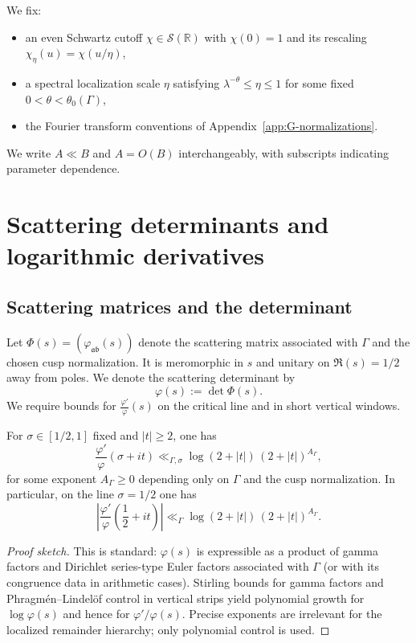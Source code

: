We fix:
\begin{itemize}
\item an even Schwartz cutoff $\chi\in\mathcal{S}(\mathbb{R})$ with $\chi(0)=1$ and its rescaling
$\chi_\eta(u)=\chi(u/\eta)$,
\item a spectral localization scale $\eta$ satisfying $\lambda^{-\theta}\le \eta\le 1$ for some fixed
$0<\theta<\theta_0(\Gamma)$,
\item the Fourier transform conventions of Appendix~\ref{app:G-normalizations}.
\end{itemize}

We write $A\ll B$ and $A=O(B)$ interchangeably, with subscripts indicating parameter dependence.

\section{Scattering determinants and logarithmic derivatives}
\label{sec:B.scattering}

\subsection{Scattering matrices and the determinant}
\label{subsec:B.scattering-matrix}

Let $\Phi(s)=(\varphi_{\mathfrak{a}\mathfrak{b}}(s))$ denote the scattering matrix associated with $\Gamma$ and the
chosen cusp normalization.  It is meromorphic in $s$ and unitary on $\Re(s)=1/2$ away from poles.  We denote the
scattering determinant by
\[
\varphi(s):=\det \Phi(s).
\]
We require bounds for $\frac{\varphi'}{\varphi}(s)$ on the critical line and in short vertical windows.

\begin{proposition}
\label{prop:B.scattering-poly}
For $\sigma\in[1/2,1]$ fixed and $|t|\ge 2$, one has
\begin{equation}
\label{eq:B.scattering-poly}
\frac{\varphi'}{\varphi}(\sigma+it)
\ll_{\Gamma,\sigma}
\log(2+|t|)\,(2+|t|)^{A_\Gamma},
\end{equation}
for some exponent $A_\Gamma\ge 0$ depending only on $\Gamma$ and the cusp normalization.
In particular, on the line $\sigma=1/2$ one has
\[
\left|\frac{\varphi'}{\varphi}\!\left(\frac12+it\right)\right|
\ll_{\Gamma}
\log(2+|t|)\,(2+|t|)^{A_\Gamma}.
\]
\end{proposition}

\begin{proof}[Proof sketch]
This is standard: $\varphi(s)$ is expressible as a product of gamma factors and Dirichlet series-type Euler factors
associated with $\Gamma$ (or with its congruence data in arithmetic cases).  Stirling bounds for gamma factors and
Phragm\'en--Lindel\"of control in vertical strips yield polynomial growth for $\log \varphi(s)$ and hence for
$\varphi'/\varphi(s)$.
Precise exponents are irrelevant for the localized remainder hierarchy; only polynomial control is used.
\end{proof}

